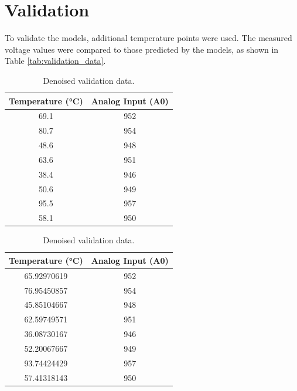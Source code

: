 \documentclass[journal,onecolumn]{IEEEtran}
\begin{document}
	\section{Validation}
	To validate the models, additional temperature points were used. The measured voltage values were compared to those predicted by the models, as shown in Table \ref{tab:validation_data}.
		\begin{table}[h]
		\centering
		\begin{minipage}[b]{0.45\textwidth}
			\centering
					\caption{Measured validation data.}
			\label{tab:validation_data}
			\begin{tabular}{@{}cc@{}}
				\toprule
				Temperature (°C) & Analog Input (A0) \\ \midrule
				69.1                 & 952          \\
				80.7                 & 954          \\
				48.6                 & 948          \\
				63.6                 & 951          \\
				38.4                 & 946          \\
				50.6                 & 949          \\
				95.5                 & 957          \\
				58.1                 & 950          \\ \bottomrule
			\end{tabular}
		\end{minipage}
		\hspace{0.009\textwidth}
		\begin{minipage}[b]{0.45\textwidth}
			\centering
					\caption{Denoised validation data.}
			\label{tab:denoised_validation_data}
			\begin{tabular}{@{}cc@{}}
				\toprule
				Temperature (°C) & Analog Input (A0) \\ \midrule
				65.92970619                 & 952          \\
				76.95450857                 & 954          \\
				45.85104667                 & 948          \\
				62.59749571                 & 951          \\
				36.08730167                 & 946          \\
				52.20067667                 & 949          \\
				93.74424429                 & 957          \\
				57.41318143                 & 950          \\ \bottomrule
			\end{tabular}
		\end{minipage}
	\end{table}
\end{document}
